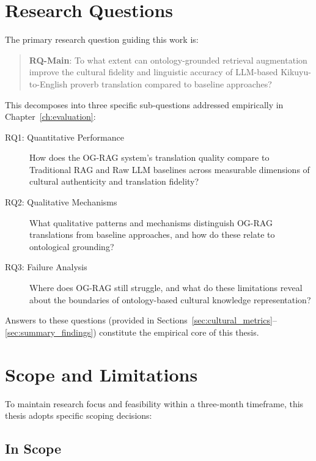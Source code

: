 \section{Research Questions}
\label{sec:research_questions}
\label{subsec:research_questions}  %

The primary research question guiding this work is:

\begin{quote}
\textbf{RQ-Main}: To what extent can ontology-grounded retrieval augmentation improve the cultural fidelity and linguistic accuracy of LLM-based Kikuyu-to-English proverb translation compared to baseline approaches?
\end{quote}

This decomposes into three specific sub-questions addressed empirically in Chapter~\ref{ch:evaluation}:

\begin{description}
    \item[RQ1: Quantitative Performance] How does the OG-RAG system's translation quality compare to Traditional RAG and Raw LLM baselines across measurable dimensions of cultural authenticity and translation fidelity?
    
    \item[RQ2: Qualitative Mechanisms] What qualitative patterns and mechanisms distinguish OG-RAG translations from baseline approaches, and how do these relate to ontological grounding?
    
    \item[RQ3: Failure Analysis] Where does OG-RAG still struggle, and what do these limitations reveal about the boundaries of ontology-based cultural knowledge representation?
\end{description}

Answers to these questions (provided in Sections~\ref{sec:cultural_metrics}--\ref{sec:summary_findings}) constitute the empirical core of this thesis.

\section{Scope and Limitations}
\label{sec:scope}

To maintain research focus and feasibility within a three-month timeframe, this thesis adopts specific scoping decisions:

\subsection{In Scope}
\label{subsec:in_scope}

